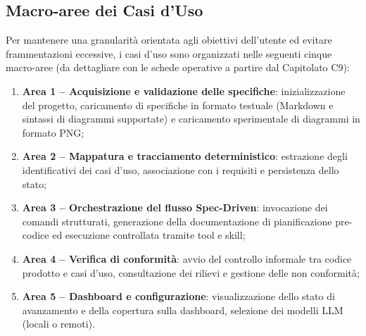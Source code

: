 \documentclass[11pt, a4paper]{article}
\begin{document}
\subsection{Macro-aree dei Casi d'Uso}
Per mantenere una granularità orientata agli obiettivi dell'utente ed evitare frammentazioni eccessive, i casi d'uso sono organizzati nelle seguenti cinque macro-aree (da dettagliare con le schede operative a partire dal Capitolato C9):
\begin{enumerate}
    \item \textbf{Area 1 -- Acquisizione e validazione delle specifiche}: inizializzazione del progetto, caricamento di specifiche in formato testuale (Markdown e sintassi di diagrammi supportate) e caricamento sperimentale di diagrammi in formato PNG;
    \item \textbf{Area 2 -- Mappatura e tracciamento deterministico}: estrazione degli identificativi dei casi d'uso, associazione con i requisiti e persistenza dello stato;
    \item \textbf{Area 3 -- Orchestrazione del flusso Spec-Driven}: invocazione dei comandi strutturati, generazione della documentazione di pianificazione pre-codice ed esecuzione controllata tramite tool e skill;
    \item \textbf{Area 4 -- Verifica di conformità}: avvio del controllo informale tra codice prodotto e casi d'uso, consultazione dei rilievi e gestione delle non conformità;
    \item \textbf{Area 5 -- Dashboard e configurazione}: visualizzazione dello stato di avanzamento e della copertura sulla dashboard, selezione dei modelli LLM (locali o remoti).
\end{enumerate}
\end{document}
